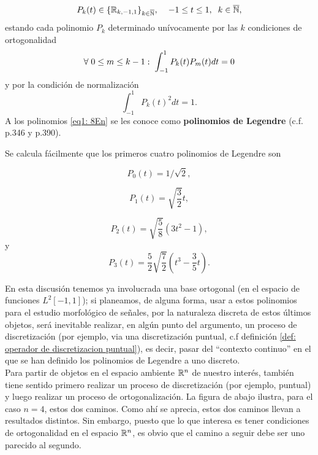 \begin{equation}
\label{eq1: 8En}
P_{k}(t)\in \{\mathbb{R}_{k, -1,1}\}_{k \in \overline{\mathbb{N}}}, \hspace{0.4cm}
-1 \leq t \leq 1, \hspace{0.2cm}
 k \in \overline{\mathbb{N}},
\end{equation}
estando cada polinomio $P_{k}$ determinado unívocamente
por las $k$ condiciones de ortogonalidad
\[
\forall \hspace{0.1cm} 0 \leq m \leq k-1: \hspace{0.1cm}
\int_{-1}^{1}{P_{k}(t)P_{m}(t)} dt = 0
\]
y por la condición de normalización 
\[
\int_{-1}^{1}{P_{k}(t)^{2}} dt = 1.
\]
A los polinomios \eqref{eq1: 8En}
se les conoce como \textbf{polinomios de Legendre}
 (c.f. \cite{friedberg} p.346
y \cite{DSML} p.390).

Se calcula fácilmente que los primeros cuatro 
polinomios de Legendre son

\[
P_{0}(t) = 1/\sqrt{2},
\]

\[
P_{1}(t) = \sqrt{\frac{3}{2}}t,
\]

\[
P_{2}(t) = \sqrt{\frac{5}{8}}\left( 3t^{2}-1 \right),
\]
y
\[
P_{3}(t) = \frac{5}{2} \sqrt{\frac{7}{2}}\left( t^{3}- \frac{3}{5}t\right).
\]

En esta discusión tenemos ya involucrada una base ortogonal
(en el espacio de funciones $L^{2}[-1,1]$);
si planeamos, de alguna forma, usar a estos polinomios
para el estudio morfológico de señales, por la naturaleza
discreta de estos últimos objetos, será
inevitable realizar, en algún punto 
del argumento, un proceso de discretización
(por ejemplo, 
via una discretización
puntual, c.f definición \ref{def: operador de discretizacion puntual}), es decir,
pasar del ``contexto continuo'' en el que se han
definido los polinomios de Legendre a uno discreto. \\

Para partir de
objetos en el espacio ambiente
$\mathbb{R}^{n}$ de nuestro interés,
también tiene sentido primero realizar
un proceso de discretización (por ejemplo, 
puntual) y luego realizar
un proceso de ortogonalización. La figura
de abajo
ilustra, para el caso $n=4$, estos dos caminos.
Como ahí se aprecia, estos dos caminos llevan 
a resultados distintos. Sin embargo, puesto que lo
que interesa es tener condiciones de ortogonalidad
en el espacio $\mathbb{R}^{n}$, es obvio que 
el camino a seguir debe ser uno parecido al segundo. \\


